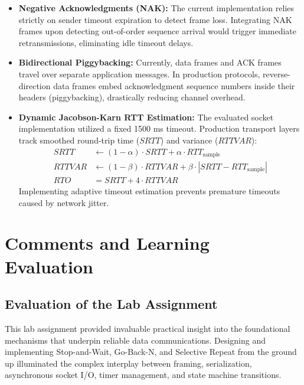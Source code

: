 \documentclass[11pt,a4paper]{article}
\begin{document}
\begin{itemize}
    \item \textbf{Negative Acknowledgments (NAK):} The current implementation relies strictly on sender timeout expiration to detect frame loss. Integrating NAK frames upon detecting out-of-order sequence arrival would trigger immediate retransmissions, eliminating idle timeout delays.
    \item \textbf{Bidirectional Piggybacking:} Currently, data frames and ACK frames travel over separate application messages. In production protocols, reverse-direction data frames embed acknowledgment sequence numbers inside their headers (piggybacking), drastically reducing channel overhead.
    \item \textbf{Dynamic Jacobson-Karn RTT Estimation:} The evaluated socket implementation utilized a fixed 1500 ms timeout. Production transport layers track smoothed round-trip time (\(SRTT\)) and variance (\(RTTVAR\)):
    \begin{align}
        SRTT &\leftarrow (1 - \alpha) \cdot SRTT + \alpha \cdot RTT_{\text{sample}} \\
        RTTVAR &\leftarrow (1 - \beta) \cdot RTTVAR + \beta \cdot |SRTT - RTT_{\text{sample}}| \\
        RTO &= SRTT + 4 \cdot RTTVAR
    \end{align}
    Implementing adaptive timeout estimation prevents premature timeouts caused by network jitter.
\end{itemize}

\section{Comments and Learning Evaluation}

\subsection{Evaluation of the Lab Assignment}

This lab assignment provided invaluable practical insight into the foundational mechanisms that underpin reliable data communications. Designing and implementing Stop-and-Wait, Go-Back-N, and Selective Repeat from the ground up illuminated the complex interplay between framing, serialization, asynchronous socket I/O, timer management, and state machine transitions.
\end{document}
